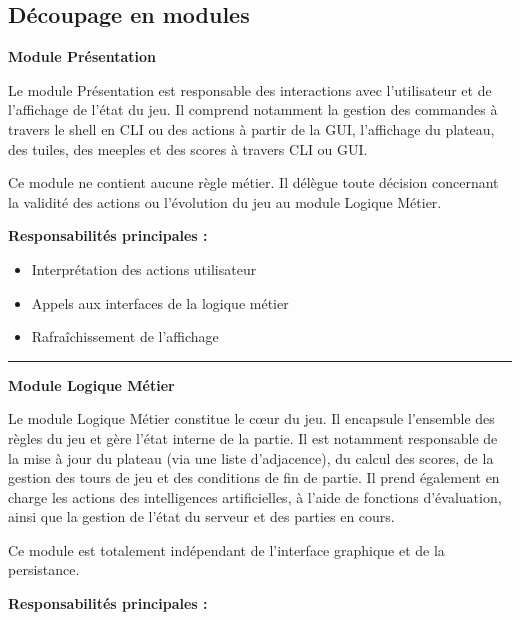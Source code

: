\documentclass[11pt]{article}
\begin{document}
\subsection{Découpage en modules}

\begin{tcolorbox}[
  colback=gray!5,
  colframe=black,
  boxrule=0.8pt,
  arc=2mm
  top=2pt, bottom=2pt, left=4pt, right=4pt
]
\large\textbf{Module Présentation}\normalsize
\vspace{0.3em}

Le module Présentation est responsable des interactions avec l'utilisateur et de l'affichage de l'état du jeu.
Il comprend notamment la gestion des commandes à travers le shell en CLI ou des actions à partir de la GUI, l'affichage du plateau, des tuiles, des meeples et des scores à travers CLI ou GUI.

Ce module ne contient aucune règle métier. Il délègue toute décision concernant la validité des actions ou l'évolution du jeu au module Logique Métier.

\vspace{0.5em}
\textbf{Responsabilités principales :}
\begin{itemize}
  \item[$\bullet$] Interprétation des actions utilisateur


  \item[$\bullet$] Appels aux interfaces de la logique métier


  \item[$\bullet$] Rafraîchissement de l'affichage
\end{itemize}

\medskip
\hrule
\medskip

\large\textbf{Module Logique Métier}\normalsize
\vspace{0.3em}

Le module Logique Métier constitue le cœur du jeu.
Il encapsule l'ensemble des règles du jeu et gère l'état interne de la partie.
Il est notamment responsable de la mise à jour du plateau (via une liste d'adjacence), du calcul des scores, de la gestion des tours de jeu et des conditions de fin de partie. 
Il prend également en charge les actions des intelligences artificielles, à l'aide de fonctions d'évaluation, ainsi que la gestion de l'état du serveur et des parties en cours.

Ce module est totalement indépendant de l'interface graphique et de la persistance.

\vspace{0.5em}
\textbf{Responsabilités principales :}


\end{tcolorbox}
\end{document}
